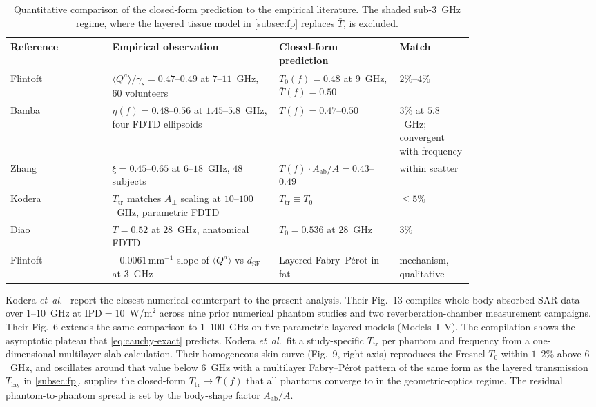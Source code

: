 \documentclass[journal,twocolumn,10pt]{IEEEtran}
\theoremstyle{plain}
\newcommand{\IPD}{\mathrm{IPD}}
\newcommand{\Aab}{A_{\mathrm{ab}}}
\newcommand{\Aperp}{A_\perp}
\newcommand{\Tbar}{\bar{T}}
\newcommand{\Tlay}{T_{\mathrm{lay}}}
\begin{document}
\begin{table}[!t]
\centering
\caption{Quantitative comparison of the closed-form prediction to the
empirical literature. The shaded sub-$3$~GHz regime, where the
layered tissue model in \cref{subsec:fp} replaces $\Tbar$, is
excluded.}
\label{tab:waterfall}
\begin{tabular}{lp{0.36\linewidth}p{0.26\linewidth}p{0.16\linewidth}}
\toprule
Reference & Empirical observation & Closed-form prediction & Match \\
\midrule
Flintoft~\cite{Flintoft2014}
& $\langle Q^a\rangle/\gamma_s = 0.47$--$0.49$ at $7$--$11$~GHz, $60$ volunteers
& $T_0(f) = 0.48$ at $9$~GHz, $\Tbar(f) = 0.50$
& $2\%$--$4\%$ \\
Bamba~\cite{Bamba2014}
& $\eta(f) = 0.48$--$0.56$ at $1.45$--$5.8$~GHz, four FDTD ellipsoids
& $\Tbar(f) = 0.47$--$0.50$
& $3\%$ at $5.8$~GHz; convergent with frequency \\
Zhang~\cite{Zhang2017thesis}
& $\xi = 0.45$--$0.65$ at $6$--$18$~GHz, $48$ subjects
& $\Tbar(f)\cdot\Aab/A = 0.43$--$0.49$
& within scatter \\
Kodera~\cite{Kodera2024}
& $T_{\mathrm{tr}}$ matches $\Aperp$ scaling at $10$--$100$~GHz, parametric FDTD
& $T_{\mathrm{tr}} \equiv T_0$
& $\le 5\%$ \\
Diao~\cite{Diao2024}
& $T = 0.52$ at $28$~GHz, anatomical FDTD
& $T_0 = 0.536$ at $28$~GHz
& $3\%$ \\
Flintoft~\cite{Flintoft2014}
& $-0.0061\,\mathrm{mm}^{-1}$ slope of $\langle Q^a\rangle$ vs $d_{\mathrm{SF}}$ at $3$~GHz
& Layered Fabry--P\'erot in fat
& mechanism, qualitative \\
\bottomrule
\end{tabular}
\end{table}

Kodera \textit{et~al.}~\cite{Kodera2024} report the closest numerical
counterpart to the present analysis. Their Fig.~13 compiles
whole-body absorbed SAR data over $1$--$10$~GHz at
$\IPD = 10$~W/m$^2$ across nine prior numerical phantom studies and
two reverberation-chamber measurement campaigns. Their Fig.~6
extends the same comparison to $1$--$100$~GHz on five parametric
layered models (Models~I--V). The compilation shows the asymptotic
plateau that \eqref{eq:cauchy-exact} predicts. Kodera
\textit{et~al.}\ fit a study-specific $T_{\mathrm{tr}}$ per phantom
and frequency from a one-dimensional multilayer slab calculation.
Their homogeneous-skin curve (Fig.~9, right axis) reproduces the
Fresnel $T_0$ within $1$--$2\%$ above $6$~GHz, and oscillates around
that value below $6$~GHz with a multilayer Fabry--P\'erot pattern of
the same form as the layered transmission $\Tlay$ in
\cref{subsec:fp}.  supplies the closed-form
$T_{\mathrm{tr}} \to \Tbar(f)$ that all phantoms converge to in the
geometric-optics regime. The residual phantom-to-phantom spread is
set by the body-shape factor $\Aab/A$.
\end{document}
